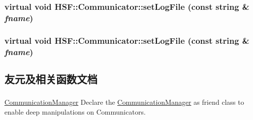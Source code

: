 \label{classHSF_1_1Communicator_a0c67eacadd200a1f385bf1487561d05d}
\hypertarget{classHSF_1_1Communicator_a0c67eacadd200a1f385bf1487561d05d}{
\subsubsection[{setLogFile}]{\setlength{\rightskip}{0pt plus 5cm}virtual void HSF::Communicator::setLogFile (const string \& {\em fname})}}
\label{classHSF_1_1Communicator_a0c67eacadd200a1f385bf1487561d05d}
\hypertarget{classHSF_1_1Communicator_a0c67eacadd200a1f385bf1487561d05d}{
\subsubsection[{setLogFile}]{\setlength{\rightskip}{0pt plus 5cm}virtual void HSF::Communicator::setLogFile (const string \& {\em fname})}}
\label{classHSF_1_1Communicator_a0c67eacadd200a1f385bf1487561d05d}


\subsection{友元及相关函数文档}
\hypertarget{classHSF_1_1Communicator_a24b77c60a7c2901833ba7bf4e02540c7}{
\subsubsection[{CommunicationManager}]{}}
\label{classHSF_1_1Communicator_a24b77c60a7c2901833ba7bf4e02540c7}


\hyperlink{classHSF_1_1CommunicationManager}{CommunicationManager} Declare the \hyperlink{classHSF_1_1CommunicationManager}{CommunicationManager} as friend class to enable deep manipulations on Communicators. 

